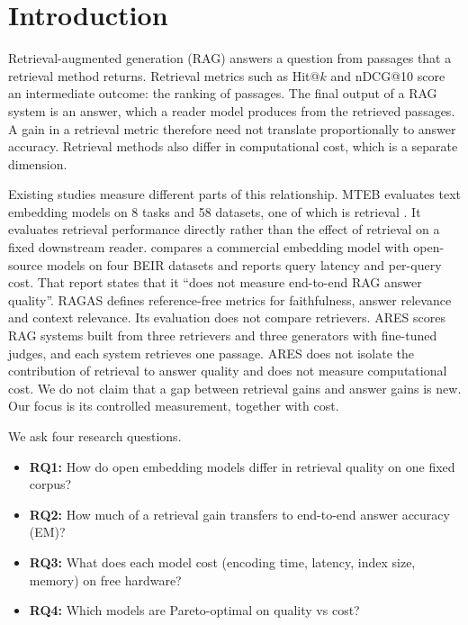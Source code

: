 \section{Introduction}
\label{sec:intro}

Retrieval-augmented generation (RAG) answers a question from passages that a retrieval method returns.
Retrieval metrics such as Hit@$k$ and nDCG@10 score an intermediate outcome: the ranking of passages.
The final output of a RAG system is an answer, which a reader model produces from the retrieved passages.
A gain in a retrieval metric therefore need not translate proportionally to answer accuracy.
Retrieval methods also differ in computational cost, which is a separate dimension.

Existing studies measure different parts of this relationship.
MTEB evaluates text embedding models on 8 tasks and 58 datasets, one of which is retrieval \citep{muennighoff2022mteb}.
It evaluates retrieval performance directly rather than the effect of retrieval on a fixed downstream reader.
\citet{baidya2026choosing} compares a commercial embedding model with open-source models on four BEIR datasets and reports query latency and per-query cost.
That report states that it ``does not measure end-to-end RAG answer quality''.
RAGAS \citep{es2023ragas} defines reference-free metrics for faithfulness, answer relevance and context relevance.
Its evaluation does not compare retrievers.
ARES \citep{saadfalcon2024ares} scores RAG systems built from three retrievers and three generators with fine-tuned judges, and each system retrieves one passage.
ARES does not isolate the contribution of retrieval to answer quality and does not measure computational cost.
We do not claim that a gap between retrieval gains and answer gains is new.
Our focus is its controlled measurement, together with cost.

We ask four research questions.
\begin{itemize}
\item \textbf{RQ1:} How do open embedding models differ in retrieval quality on one fixed corpus?
\item \textbf{RQ2:} How much of a retrieval gain transfers to end-to-end answer accuracy (EM)?
\item \textbf{RQ3:} What does each model cost (encoding time, latency, index size, memory) on free hardware?
\item \textbf{RQ4:} Which models are Pareto-optimal on quality vs cost?
\end{itemize}

